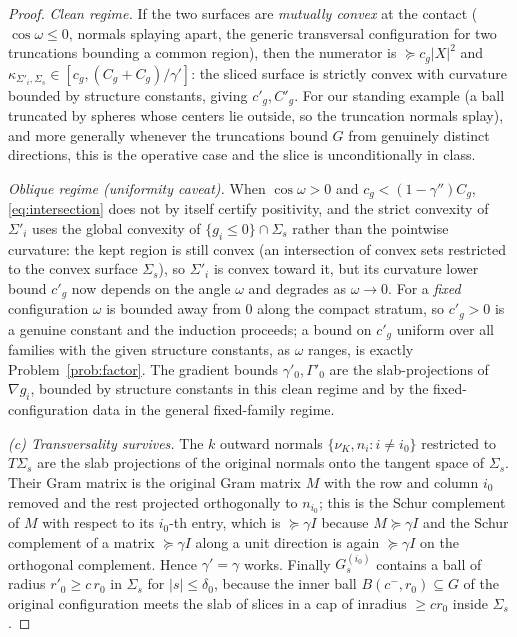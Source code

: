 \documentclass[11pt]{article}
\begin{document}
\begin{proof}
\emph{Clean regime.}  If the two surfaces are \emph{mutually convex} at the
contact ($\cos\omega\le0$, normals splaying apart, the generic transversal
configuration for two truncations bounding a common region), then the numerator
is $\succeq c_g|X|^2$ and $\kappa_{\Sigma'_i,\Sigma_s}\in[c_g,(C_g+C_g)/\gamma']$:
the sliced surface is strictly convex with curvature bounded by structure
constants, giving $c'_g,C'_g$.  For our standing example (a ball truncated by
spheres whose centers lie outside, so the truncation normals splay), and more
generally whenever the truncations bound $G$ from genuinely distinct directions,
this is the operative case and the slice is unconditionally in class.

\emph{Oblique regime (uniformity caveat).}  When $\cos\omega>0$ and
$c_g<(1-\gamma'')C_g$, \eqref{eq:intersection} does not by itself certify
positivity, and the strict convexity of $\Sigma'_i$ uses the global convexity of
$\{g_i\le0\}\cap\Sigma_s$ rather than the pointwise curvature: the kept region is
still convex (an intersection of convex sets restricted to the convex surface
$\Sigma_s$), so $\Sigma'_i$ is convex toward it, but its curvature lower bound
$c'_g$ now depends on the angle $\omega$ and degrades as $\omega\to0$.  For a
\emph{fixed} configuration $\omega$ is bounded away from $0$ along the compact
stratum, so $c'_g>0$ is a genuine constant and the induction proceeds; a bound on
$c'_g$ uniform over all families with the given structure constants, as
$\omega$ ranges, is exactly Problem~\ref{prob:factor}.  The gradient bounds
$\gamma'_0,\Gamma'_0$ are the slab-projections of $\nabla g_i$, bounded by
structure constants in this clean regime and by the fixed-configuration data in
the general fixed-family regime.

\emph{(c) Transversality survives.}  The $k$ outward normals
$\{\nu_K,n_i:i\ne i_0\}$ restricted to $T\Sigma_s$ are the slab projections of
the original normals onto the tangent space of $\Sigma_s$.  Their Gram matrix is
the original Gram matrix $M$ with the row and column $i_0$ removed and the rest
projected orthogonally to $n_{i_0}$; this is the Schur complement of $M$ with
respect to its $i_0$-th entry, which is $\succeq\gamma I$ because $M\succeq\gamma
I$ and the Schur complement of a matrix $\succeq\gamma I$ along a unit direction
is again $\succeq\gamma I$ on the orthogonal complement.  Hence $\gamma'=\gamma$
works.  Finally $G^{(i_0)}_s$ contains a ball of radius $r'_0\ge c\,r_0$ in
$\Sigma_s$ for $|s|\le\delta_0$, because the inner ball $B(c^-,r_0)\subseteq G$
of the original configuration meets the slab of slices in a cap of inradius
$\ge c r_0$ inside $\Sigma_s$.
\end{proof}
\end{document}
